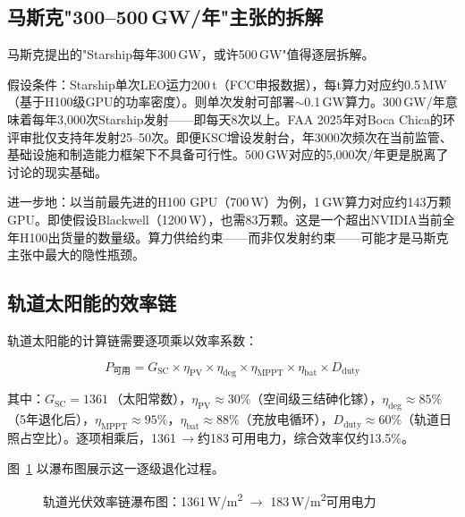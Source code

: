 \subsection{马斯克"300--500\,GW/年"主张的拆解}

马斯克提出的"Starship每年300\,GW，或许500\,GW"\cite{musk2025starship}值得逐层拆解。

假设条件：Starship单次LEO运力200\,t（FCC申报数据\cite{spacex2026fcc}），每t算力对应约0.5\,MW（基于H100级GPU的功率密度）。则单次发射可部署$\sim$0.1\,GW算力。300\,GW/年意味着每年3,000次Starship发射——即每天8次以上。FAA 2025年对Boca Chica的环评审批\cite{faa2025boca}仅支持年发射25--50次。即便KSC增设发射台\cite{faa2026ksc}，年3000次频次在当前监管、基础设施和制造能力框架下不具备可行性。500\,GW对应的5,000次/年更是脱离了讨论的现实基础。

进一步地：以当前最先进的H100 GPU（700\,W）为例，1\,GW算力对应约143万颗GPU。即使假设Blackwell（1200\,W）\cite{nvidia2026rubin}，也需83万颗。这是一个超出NVIDIA当前全年H100出货量的数量级。算力供给约束——而非仅发射约束——可能才是马斯克主张中最大的隐性瓶颈。

\subsection{轨道太阳能的效率链}

轨道太阳能的计算链需要逐项乘以效率系数：

\[
P_{\text{可用}} = G_{\text{SC}} \times \eta_{\text{PV}} \times \eta_{\text{deg}} \times \eta_{\text{MPPT}} \times \eta_{\text{bat}} \times D_{\text{duty}}
\]

其中：$G_{\text{SC}}=1361$\,\unitWpm{}（太阳常数），$\eta_{\text{PV}}\approx 30\%$（空间级三结砷化镓\cite{zhang2025solar}），$\eta_{\text{deg}}\approx 85\%$（5年退化后），$\eta_{\text{MPPT}}\approx 95\%$，$\eta_{\text{bat}}\approx 88\%$（充放电循环），$D_{\text{duty}}\approx 60\%$（轨道日照占空比）。逐项相乘后，1361\,\unitWpm{}$\rightarrow$约183\,\unitWpm{}可用电力，综合效率仅约13.5\%。

图~\ref{fig:pv_chain} 以瀑布图展示这一逐级退化过程。

\begin{figure}[H]
\centering

\caption{轨道光伏效率链瀑布图：1361\,W/m\textsuperscript{2} $\rightarrow$ 183\,W/m\textsuperscript{2}可用电力}
\label{fig:pv_chain}
\end{figure}

